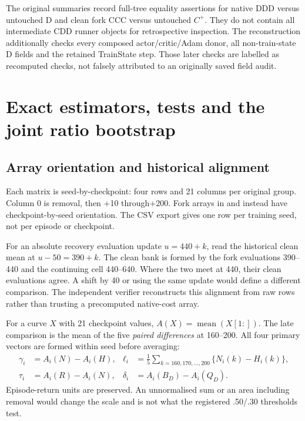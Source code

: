 The original summaries record full-tree equality assertions for native DDD versus untouched D and clean fork CCC versus untouched $C^+$. They do not contain all intermediate CDD runner objects for retrospective inspection. The reconstruction additionally checks every composed actor/critic/Adam donor, all non-train-state D fields and the retained TrainState step. Those later checks are labelled as recomputed checks, not falsely attributed to an originally saved field audit.

\section{Exact estimators, tests and the joint ratio bootstrap}\label{app:statistics}
\subsection{Array orientation and historical alignment}
Each  matrix is seed-by-checkpoint: four rows and 21 columns per original group. Column 0 is removal, then +10 through+200. Fork arrays in  and  instead have checkpoint-by-seed orientation. The CSV export gives one row per training seed, not per episode or checkpoint.

For an absolute recovery evaluation update $u=440+k$, read the historical clean mean at $u-50=390+k$. The clean bank is formed by the fork evaluations 390--440 and the continuing  cell 440--640. Where the two meet at 440, their clean evaluations agree. A shift by 40 or using the same update would define a different comparison. The independent verifier reconstructs this alignment from raw rows rather than trusting a precomputed native-cost array.

For a curve $X$ with 21 checkpoint values, $A(X)=\operatorname{mean}(X[1:])$. The late comparison is the mean of the five \emph{paired differences} at 160--200. All four primary vectors are formed within seed before averaging:
\begin{align}
\gamma_i&=A_i(N)-A_i(H),& \ell_i&=\tfrac15\sum_{k=160,170,\ldots,200}\{N_i(k)-H_i(k)\},\\
\tau_i&=A_i(R)-A_i(N),& \delta_i&=A_i(B_D)-A_i(Q_D).
\end{align}
Episode-return units are preserved. An unnormalised sum or an area including removal would change the scale and is not what the registered .50/.30 thresholds test.

